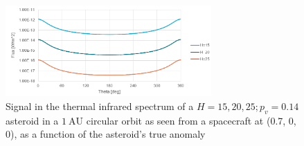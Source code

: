\begin{figure}[htbp]
 \centering
 \includegraphics[width=0.7\textwidth]{img/implementation_tir_signal.png}
 \caption{Signal in the thermal infrared spectrum of a $H=15, 20, 25; p_v=0.14$ asteroid in a $1~\mathrm{AU}$ circular orbit as seen from a spacecraft at (0.7, 0, 0), as a function of the asteroid's true anomaly}
 \label{fig:thermal_signal_implementation}
\end{figure}


